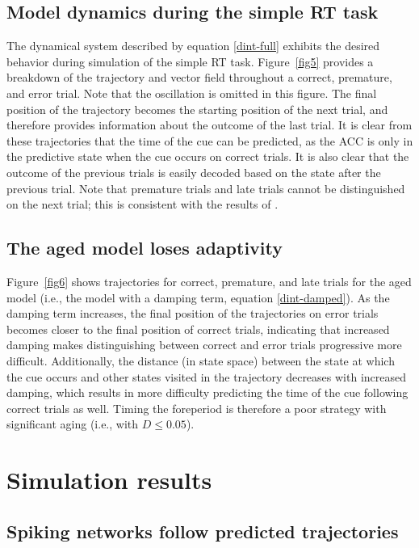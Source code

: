 \documentclass[11pt]{article}
\begin{document}
\subsection{Model dynamics during the simple RT task}

The dynamical system described by equation \eqref{dint-full}
exhibits the desired behavior during simulation
of the simple RT task.
Figure~\ref{fig5} provides a breakdown of
the trajectory and vector field
throughout a correct, premature, and error trial.
Note that the oscillation is omitted
in this figure.
The final position of
the trajectory becomes the starting position
of the next trial, and therefore
provides information about
the outcome of the last trial.
It is clear from these trajectories
that the time of the cue
can be predicted,
as the ACC is only in the predictive state
when the cue occurs on correct trials.
It is also clear that the
outcome of the previous trials
is easily decoded based
on the state after the previous trial.
Note that premature trials
and late trials cannot be distinguished
on the next trial;
this is consistent with the results of
\citet{Narayanan2009}.

\subsection{The aged model loses adaptivity}

Figure~\ref{fig6} shows trajectories for
correct, premature, and late trials
for the aged model (i.e., the model with a damping term,
equation \eqref{dint-damped}).
As the damping term increases, the final position
of the trajectories on error trials
becomes closer to the final position of correct trials,
indicating that increased damping
makes distinguishing between correct and error trials
progressive more difficult.
Additionally, the distance (in state space) between
the state at which the cue occurs
and other states visited in the trajectory
decreases with increased damping,
which results in more difficulty
predicting the time of the cue
following correct trials as well.
Timing the foreperiod is therefore
a poor strategy with significant aging
(i.e., with $D \le 0.05$).

\section{Simulation results}

\subsection{Spiking networks follow predicted trajectories}
\end{document}

